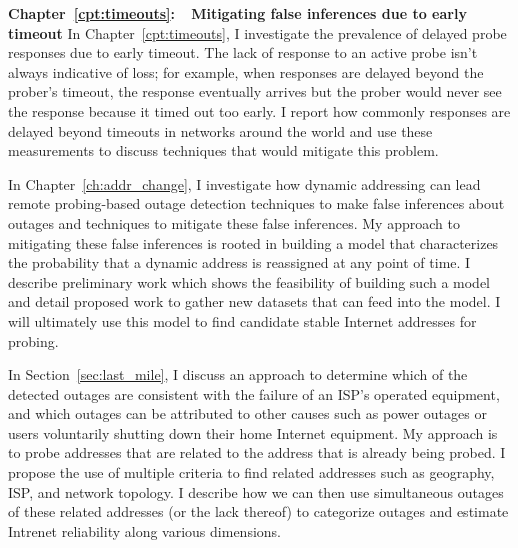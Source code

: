 \textbf{Chapter~\ref{cpt:timeouts}:~~Mitigating false inferences due
to early timeout} In Chapter~\ref{cpt:timeouts}, I investigate the
prevalence of delayed probe responses due to early timeout. The lack
of response to an active probe isn't always indicative of loss; for
example, when responses are delayed beyond the prober's timeout, the
response eventually arrives but the prober would never see the
response because it timed out too early. I report how commonly
responses are delayed beyond timeouts in networks around the world and
use these measurements to discuss techniques that would mitigate this problem.

In Chapter~\ref{ch:addr_change}, I investigate how dynamic addressing can
lead remote probing-based outage detection techniques to make false inferences about outages and techniques to
mitigate these false inferences. My approach to mitigating
these false inferences is rooted in building a model that characterizes
the probability that a dynamic address is reassigned at any point of time. I describe preliminary
work which shows the feasibility of building such a model and detail
proposed work to gather new datasets that can feed into the
model. I will ultimately use this model to find candidate stable Internet
addresses for probing.

In Section~\ref{sec:last_mile}, I discuss an approach to determine
which of the detected outages are consistent with the failure of an
ISP's operated equipment, and which outages can be attributed to other
causes such as power outages or users voluntarily shutting down their home
Internet equipment. My approach is to probe addresses that are related
to the address that is already being probed. I propose the use of multiple criteria
to find related addresses such as geography, ISP, and network
topology. I describe how we can then use simultaneous outages of these
related addresses (or the lack thereof) to categorize outages and
estimate Intrenet reliability along various dimensions.



